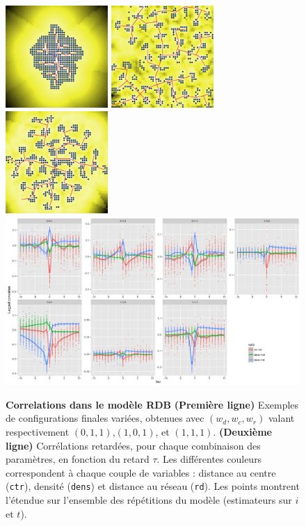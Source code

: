 \documentclass[french]{./sageo}
\begin{document}
\begin{figure}[h]
\centering
\includegraphics[width=3.9cm]{figures/ex_60_wdens0_wroad1_wcenter1_seed272727}
\includegraphics[width=3.9cm]{figures/ex_60_wdens1_wroad1_wcenter0_seed272727}
\includegraphics[width=3.9cm]{figures/ex_60_wdens1_wroad1_wcenter1_seed272727}\\\vspace{0.2cm}
\includegraphics[width=12cm]{figures/laggedcorrs_facetextreme}
\caption{\textbf{Correlations dans le modèle RDB} \textbf{(Première ligne)} Exemples de configurations finales variées, obtenues avec $(w_{d},w_{c},w_{r})$ valant respectivement $(0,1,1)$,$(1,0,1)$, et $(1,1,1)$. \textbf{(Deuxième ligne)} Corrélations retardées, pour chaque combinaison des paramètres, en fonction du retard $\tau$. Les différentes couleurs correspondent à chaque couple de variables : distance au centre (\texttt{ctr}), densité (\texttt{dens}) et distance au réseau (\texttt{rd}). Les points montrent l'étendue sur l'ensemble des répétitions du modèle (estimateurs sur $i$ et $t$).}
\label{fig:exrdb}
\end{figure}
\end{document}
